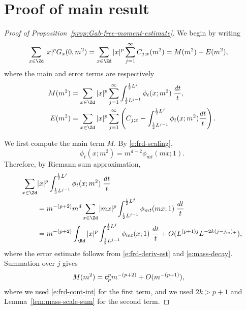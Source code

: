 \section{Proof of main result}

\begin{proof}[Proof of Proposition~\ref{prop:Gab-free-moment-estimate}]

We begin by writing
\begin{align}
\sum_{x\in\Zd} |x|^p G_x(0, m^2)
    &=
    \sum_{x\in\Zd} |x|^p
    \sum_{j=1}^\infty C_{j;x}(m^2)
    =
M(m^2)
+
E(m^2)
,
\end{align}
where the main and error terms are respectively
\begin{align}
M(m^2) &=
\sum_{x\in\Zd} |x|^p \sum_{j=1}^\infty
\int_{\frac 12 L^{j-1}}^{\frac 12 L^j} \phi_t(x; m^2) \;\frac{dt}{t},
\\
E(m^2) &= \sum_{x\in\Zd} |x|^p \sum_{j=1}^\infty \left(C_{j;x} - \int_{\frac{1}{2} L^{j-1}}^{\frac{1}{2} L^j} \phi_t(x; m^2) \frac{dt}{t}\right).
\end{align}

We first compute the main term $M$. By \eqref{e:frd-scaling},
\begin{equation}
\phi_t(x; m^2) = m^{d-2} \phi_{mt}(mx; 1).
\end{equation}
Therefore, by Riemann sum approximation,
\begin{align}
\sum_{x\in\Zd} &|x|^p \int_{\frac{1}{2} L^{j-1}}^{\frac{1}{2} L^j} \phi_t(x; m^2) \; \frac{dt}{t} \\
  &= m^{-(p+2)} m^d \sum_{x\in\Zd} |mx|^p \int_{\frac{1}{2} L^{j-1}}^{\frac{1}{2} L^j} \phi_{mt}(mx; 1) \; \frac{dt}{t}
  \\ \nonumber
  &= m^{-(p + 2)} \int_\Rd |x|^p \int_{\frac{1}{2} L^{j-1}}^{\frac{1}{2} L^j} \phi_{mt}(x; 1) \; \frac{dt}{t}
    + O(L^{(p + 1) j}
    L^{-2k(j-j_m)_+})
    ,
\end{align}
where the error estimate follows from \eqref{e:frd-deriv-est} and \eqref{e:mass-decay}.
Summation over $j$ gives
\begin{align}
M(m^2)
&= {\sf c}_p^p m^{-(p + 2)} + O(m^{-(p + 1)}),
\end{align}
where we used
\eqref{e:frd-cont-int} for the first term, and we used $2k>p+1$ and
Lemma~\ref{lem:mass-scale-sum} for the second term.


\end{proof}
